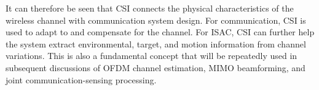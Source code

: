 It can therefore be seen that CSI connects the physical characteristics of the wireless channel
with communication system design.
For communication,
CSI is used to adapt to and compensate for the channel.
For ISAC,
CSI can further help the system extract environmental,
target,
and motion information from channel variations.
This is also a fundamental concept that will be repeatedly used in subsequent discussions of OFDM channel estimation,
MIMO beamforming,
and joint communication-sensing processing.
